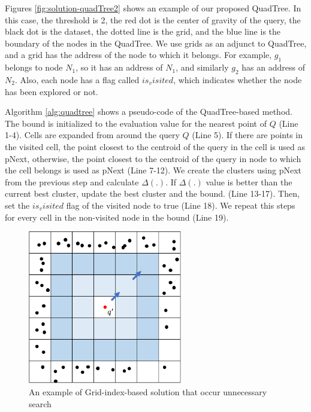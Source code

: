 \documentclass[a4paper,11pt]{report}
\theoremstyle{mytheoremstyle}
\begin{document}
Figures \ref{fig:solution-quadTree2} shows an example of our proposed QuadTree. In this case, the threshold is 2, the red dot is the center of gravity of the query, the black dot is the dataset, the dotted line is the grid, and the blue line is the boundary of the nodes in the QuadTree. We use grids as an adjunct to QuadTree, and a grid has the address of the node to which it belongs. For example, $g_1$ belongs to node $N_1$, so it has an address of $N_1$, and similarly $g_2$ has an address of $N_2$. Also, each node has a flag called $is_visited$, which indicates whether the node has been explored or not.

Algorithm \ref{alg:quadtree} shows a pseudo-code of the QuadTree-based method. The bound is initialized to the evaluation value for the nearest point of $Q$ (Line 1-4). Cells are expanded from around the query $Q$ (Line 5). If there are points in the visited cell, the point closest to the centroid of the query in the cell is used as pNext, otherwise, the point closest to the centroid of the query in node to which the cell belongs is used as pNext (Line 7-12). We create the clusters using pNext from the previous step and calculate $\Delta(.)$. If $\Delta(.)$ value is better than the current best cluster, update the best cluster and the bound. (Line 13-17). Then, set the $is_visited$ flag of the visited node to true (Line 18). We repeat this steps for every cell in the non-visited node in the bound (Line 19).

\begin{figure}
    \begin{center}
        \includegraphics[width=0.6\textwidth]{images/solution-QuadTree1.pdf}
        \caption{An example of Grid-index-based solution that occur unnecessary search} \label{fig:solution-quadTree1}
    \end{center}
\end{figure}
\end{document}

